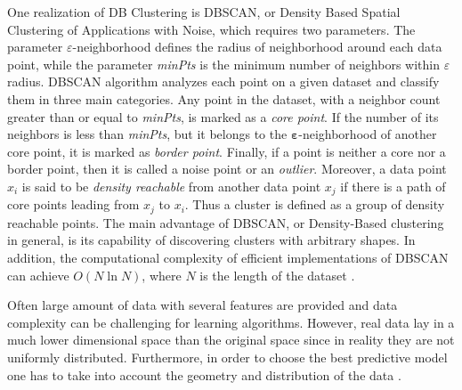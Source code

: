 \documentclass[prl,twocolumn]{revtex4-1}
\begin{document}
One realization of DB Clustering is DBSCAN, or Density Based Spatial Clustering of Applications with Noise, which requires two parameters. The parameter $\varepsilon$-neighborhood defines the radius of neighborhood around each data point, while the parameter \textit{minPts} is the minimum number of neighbors within $\varepsilon$ radius.
DBSCAN algorithm analyzes each point on a given dataset and classify them in three main categories. Any point in the dataset, with a neighbor count greater than or equal to \textit{minPts}, is marked as a \textit{core point}.
If the number of its neighbors is less than \textit{minPts}, but it belongs to the $\pmb{\varepsilon}$-neighborhood of another core point, it is marked as \textit{border point}. Finally, if a point is neither a core nor a border point, then it is called a noise point or an \textit{outlier}.
Moreover, a data point \(x_i\) is said to be \textit{density reachable} from another data point \(x_j\) if there is a path of core points leading from \(x_j\) to \(x_i\). Thus a cluster is defined as a group of density reachable points.
The main advantage of DBSCAN, or Density-Based clustering in general, is its capability of discovering clusters with arbitrary shapes. In addition, the computational complexity of efficient implementations of DBSCAN can achieve \(O(N \ln{N})\), where \(N\) is the length of the dataset
\cite{Mehta_2019}\cite{10.5555/3001460.3001507}.

Often large amount of data with several features are provided and data complexity can be challenging for learning algorithms. However, real data lay in a much lower dimensional space than the original space since in reality they are not uniformly distributed.
Furthermore, in order to choose the best predictive model one has to take into account the geometry and distribution of the data \cite{Mehta_2019}.
\end{document}
